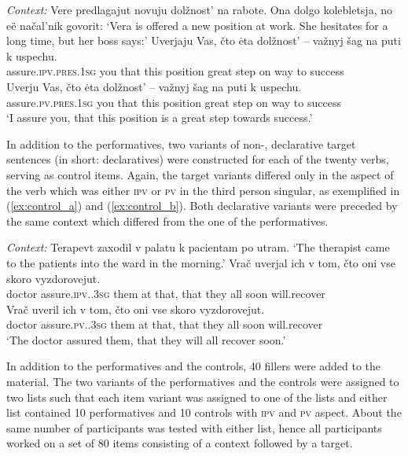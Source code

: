 \documentclass[output=paper,colorlinks,citecolor=brown,newtxmath,hidelinks]{langscibook}
\begin{document}
\ea\label{ex:item} \textit{Context:} Vere predlagajut novuju dolžnost' na rabote. Ona dolgo kolebletsja, no eë načal'nik govorit:
    \glt `Vera is offered a new position at work. She hesitates for a long time, but her boss says:'
	\ea\label{ex:item_a} 
		 \gll    Uverjaju Vas, čto ėta dolžnost' -- važnyj šag na puti k uspechu.\\
              assure\textsc{.ipv.pres.1sg} you that this position {} great step on way to success\\
	\ex\label{ex:item_b}
		 \gll    Uverju Vas, čto ėta dolžnost' -- važnyj šag na puti k uspechu.\\
              assure\textsc{.pv.pres.1sg} you that this position {} great step on way to success\\
              \z
		\glt ‘I assure you, that this position is a great step towards success.’     
\z

\noindent In addition to the performatives, two variants of non-, declarative target sentences (in short: declaratives) were constructed for each of the twenty verbs, serving as control items. Again, the target variants differed only in the aspect of the verb which was either \textsc{ipv} or \textsc{pv}  in the third person singular, as exemplified in (\ref{ex:control_a}) and (\ref{ex:control_b}). Both declarative variants were preceded by the same context which differed from the one of the performatives.

\ea\label{ex:control} \textit{Context:} Terapevt zaxodil v palatu k pacientam po utram.
    \glt ‘The therapist came to the patients into the ward in the morning.’
	\ea\label{ex:control_a} 
		 \gll    Vrač uverjal ich v tom, čto oni vse skoro vyzdorovejut.\\
              doctor assure\textsc{.ipv..3sg} them at that, that they all soon will.recover\\
	\ex\label{ex:control_b}
		 \gll    Vrač uveril ich v tom, čto oni vse skoro vyzdorovejut.\\
              doctor assure\textsc{.pv..3sg} them at that, that they all soon will.recover\\
              \z
		\glt ‘The doctor assured them, that they will all recover soon.’        
\z

\noindent In addition to the performatives and the controls, 40 fillers were added to the material. The two variants of the performatives and the controls were assigned to two lists such that each item variant was assigned to one of the lists and either list contained 10 performatives and 10 controls with \textsc{ipv} and \textsc{pv} aspect. About the same number of participants was tested with either list, hence all participants worked on a set of 80 items consisting of a context followed by a target. 
\end{document}

